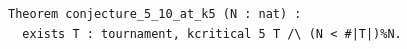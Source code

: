 \begin{lstlisting}[language=Rocq]
Theorem conjecture_5_10_at_k5 (N : nat) :
  exists T : tournament, kcritical 5 T /\ (N < #|T|)%N.
\end{lstlisting}
